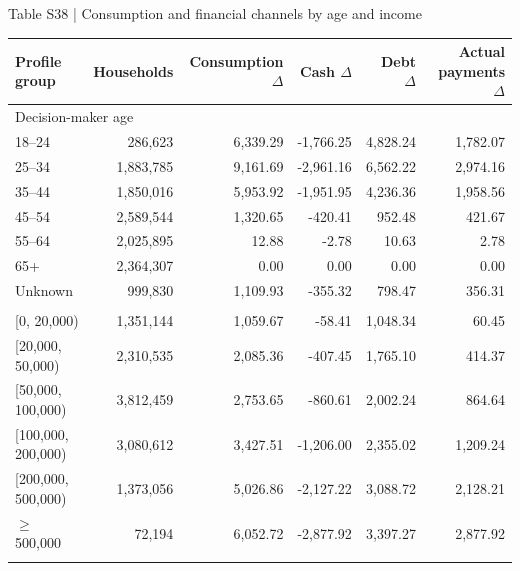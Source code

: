 \documentclass[10pt]{article}
\begin{document}
\begin{center}
\begin{minipage}{\textwidth}
\fontsize{8}{9.8}\selectfont
Table S38 | Consumption and financial channels by age and income
\par\vspace{4pt}
\begin{tabularx}{\textwidth}{@{}Xrrrrr@{}}
\toprule
Profile group & Households & Consumption $\Delta$ & Cash $\Delta$ & Debt $\Delta$ & Actual payments $\Delta$ \\
\midrule
\multicolumn{6}{l}{Decision-maker age} \\
{18--24} & 286,623 & 6,339.29 & -1,766.25 & 4,828.24 & 1,782.07 \\
{25--34} & 1,883,785 & 9,161.69 & -2,961.16 & 6,562.22 & 2,974.16 \\
{35--44} & 1,850,016 & 5,953.92 & -1,951.95 & 4,236.36 & 1,958.56 \\
{45--54} & 2,589,544 & 1,320.65 & -420.41 & 952.48 & 421.67 \\
{55--64} & 2,025,895 & 12.88 & -2.78 & 10.63 & 2.78 \\
{65+} & 2,364,307 & 0.00 & 0.00 & 0.00 & 0.00 \\
{Unknown} & 999,830 & 1,109.93 & -355.32 & 798.47 & 356.31 \\
\addlinespace[3pt]
\multicolumn{6}{l}{Annual household income (CNY)} \\
{[0, 20,000)} & 1,351,144 & 1,059.67 & -58.41 & 1,048.34 & 60.45 \\
{[20,000, 50,000)} & 2,310,535 & 2,085.36 & -407.45 & 1,765.10 & 414.37 \\
{[50,000, 100,000)} & 3,812,459 & 2,753.65 & -860.61 & 2,002.24 & 864.64 \\
{[100,000, 200,000)} & 3,080,612 & 3,427.51 & -1,206.00 & 2,355.02 & 1,209.24 \\
{[200,000, 500,000)} & 1,373,056 & 5,026.86 & -2,127.22 & 3,088.72 & 2,128.21 \\
{$\geq$500,000} & 72,194 & 6,052.72 & -2,877.92 & 3,397.27 & 2,877.92 \\
\addlinespace[3pt]
\bottomrule
\end{tabularx}
\par{}
\end{minipage}
\end{center}
\end{document}
